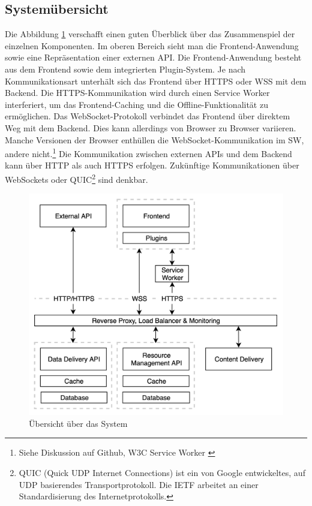 \subsection{Systemübersicht}
\label{subsec:systemuebersicht}
Die Abbildung \ref{figure:uebersichtueberdassystem} verschafft einen guten Überblick
über das Zusammenspiel der einzelnen Komponenten. Im oberen Bereich sieht man die
Frontend\hyp{}Anwendung sowie eine Repräsentation einer externen API. Die Frontend\hyp{}Anwendung
besteht aus dem Frontend sowie dem integrierten Plugin-System. Je nach Kommunikationsart
unterhält sich das Frontend über HTTPS oder WSS mit dem Backend. Die HTTPS-Kommunikation
wird durch einen Service Worker interferiert, um das Frontend-Caching und die
Offline-Funktionalität zu ermöglichen. Das WebSocket-Protokoll verbindet das Frontend
über direktem Weg mit dem Backend. Dies kann allerdings von Browser zu Browser variieren.
Manche Versionen der Browser enthüllen die WebSocket-Kommunikation im SW, andere
nicht.\footnote{Siehe Diskussion auf Github, W3C Service Worker \cite{GithubIssueWebSocketExpose}}
Die Kommunikation zwischen externen APIs und dem Backend kann über HTTP als auch
HTTPS erfolgen. Zukünftige Kommunikationen über WebSockets oder QUIC\footnote{QUIC (Quick UDP Internet Connections) ist ein von Google entwickeltes, auf UDP basierendes Transportprotokoll.\cite{IETFQUICWhatsHappening} Die IETF arbeitet an einer Standardisierung des Internetprotokolls.\cite{DatatrakcerIETFQuic}}
sind denkbar.

\begin{figure}
    \begin{center}
    \includegraphics[scale=0.2]{img/abbildungen/MicroserviceInfrastruktur}
    \end{center}
    \caption{Übersicht über das System}
    \label{figure:uebersichtueberdassystem}
\end{figure}

